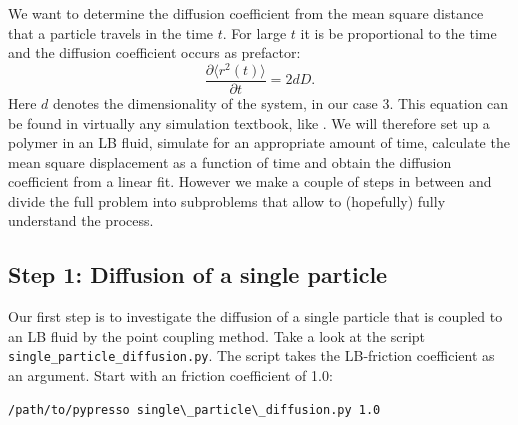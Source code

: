 We want to determine the diffusion coefficient from the mean square
distance that a particle travels in the time $t$. For large $t$ it is
be proportional to the time and the diffusion coefficient occurs as 
prefactor: 
\begin{equation}
  \frac{\partial \langle r^2 \left(t\right)\rangle}{\partial t} = 2 d D. 
  \label{eq:msd}
\end{equation}
Here $d$ denotes the dimensionality of the system, in our case 3.
This equation can be found in virtually any simulation textbook, like
\cite{frenkel02b}.
We will therefore set up a polymer in an LB fluid, simulate for an appropriate
amount of time, calculate the mean square displacement as a function of
time and obtain the diffusion coefficient from a linear fit. However
we make a couple of steps in between and divide the full problem into 
subproblems that allow to (hopefully) fully understand the process.

\subsection{Step 1: Diffusion of a single particle}
Our first step is to investigate the diffusion of a single particle
that is coupled to an LB fluid by the point coupling method.
Take a look at the script \texttt{single\_particle\_diffusion.py}.
The script takes the LB-friction coefficient as an argument. Start with
an friction coefficient of 1.0:
{\vspace{0,2cm}\small
\begin{lstlisting}[numbers=none]
/path/to/pypresso single\_particle\_diffusion.py 1.0
\end{lstlisting}
\vspace{0,2cm}
}

